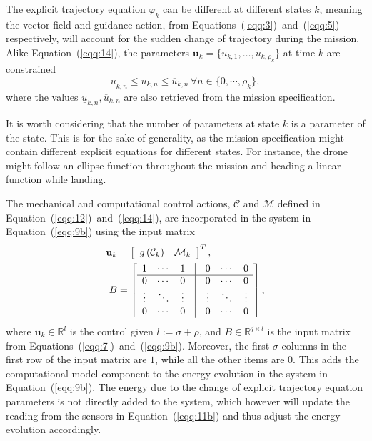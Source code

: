 \documentclass[letterpaper,10pt,conference]{ieeeconf}
\begin{document}
The explicit trajectory equation $\varphi_k$ can be different at different states $k$, meaning the vector field and guidance action, from Equations~(\ref{eqq:3})~and~(\ref{eqq:5}) respectively, will account for the sudden change of trajectory during the mission. Alike Equation~(\ref{eqq:14}), the parameters $\mathbf{u}_k=\{u_{k,1},\dots,u_{k,\rho_k}\}$ at time $k$ are constrained
\begin{equation}
  \underline{u}_{k,n}\leq u_{k,n}\leq \overline{u}_{k,n}\,\forall n\in\{0,\cdots,\rho_k\},
\end{equation}
where the values $\underline{u}_{k,n},\overline{u}_{k,n}$ are also retrieved from the mission specification.

It is worth considering that the number of parameters at state $k$ is a parameter of the state. This is for the sake of generality, as the mission specification might contain different explicit equations for different states. For instance, the drone might follow an ellipse function throughout the mission and heading a linear function while landing. 

The mechanical and computational control actions, $\mathcal{C}$ and $\mathcal{M}$ defined in Equation~(\ref{eqq:12})~and~(\ref{eqq:14}), are incorporated in the system in Equation~(\ref{eqq:9b}) using the input matrix
\begin{equation}\begin{split}
  \mathbf{u}_k&=\left[\begin{array}{cc}
    g\left(\mathcal{C}_k\right) & \mathcal{M}_k
  \end{array}\right]^T,\\
  B&=\left[\begin{array}{ccccccc}
    1 & \cdots & 1 & \vline & 0 & \cdots & 0\\\hline
    0 & \cdots & 0 & \vline & 0 & \cdots & 0\\
    \vdots & \ddots & \vdots & \vline & \vdots & \ddots & \vdots\\
    0 & \cdots & 0 & \vline & 0 & \cdots & 0
  \end{array}\right],
\end{split}
\end{equation}
where $\mathbf{u}_k\in\mathbb{R}^l$ is the control given $l:=\sigma+\rho$, and $B\in\mathbb{R}^{j\times l}$ is the input matrix from Equations~(\ref{eqq:7})~and~(\ref{eqq:9b}). Moreover, the first $\sigma$ columns in the first row of the input matrix are $1$, while all the other items are $0$. This adds the computational model component to the energy evolution in the system in Equation~(\ref{eqq:9b}). The energy due to the change of explicit trajectory equation parameters is not directly added to the system, which however will update the reading from the sensors in Equation~(\ref{eqq:11b}) and thus adjust the energy evolution accordingly.
\end{document}
